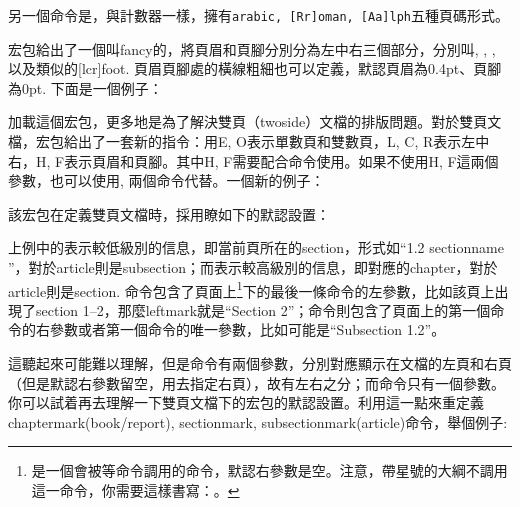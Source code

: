 另一個命令是，與計數器一樣，擁有\texttt{arabic, [Rr]oman, [Aa]lph}五種頁碼形式。

宏包給出了一個叫fancy的，將頁眉和頁腳分別分為左中右三個部分，分別叫, , , 以及類似的[lcr]foot. 頁眉頁腳處的橫線粗細也可以定義，默認頁眉為0.4pt、頁腳為0pt. 下面是一個例子：
\begin{latex}
\usepackage{fancyhdr}
\pagestyle{fancy}
    \lhead{}
    \chead{}
    \cfoot{\thepage}
\renewcommand{\headrulewidth}{0.4pt}
\renewcommand{\footrulewidth}{0.4pt}
\end{latex}

加載這個宏包，更多地是為了解決雙頁（twoside）文檔的排版問題。對於雙頁文檔，宏包給出了一套新的指令：用E, O表示單數頁和雙數頁，L, C, R表示左中右，H, F表示頁眉和頁腳。其中H, F需要配合命令使用。如果不使用H, F這兩個參數，也可以使用,  兩個命令代替。一個新的例子：
\begin{latex}
\fancyhead{} %
\fancyfoot{} %
    \fancyfoot[C]{\thepage}
\end{latex}

該宏包在定義雙頁文檔時，採用瞭如下的默認設置：
\begin{latex}
\fancyhead[LE,RO]{\slshape \rightmark}
\fancyhead[LO,RE]{\slshape \leftmark}
\fancyfoot[C]{\thepage}
\end{latex}

上例中的表示較低級別的信息，即當前頁所在的section，形式如“1.2 sectionname ”，對於article則是subsection；而表示較高級別的信息，即對應的chapter，對於article則是section. 命令包含了頁面上\footnote{是一個會被等命令調用的命令，默認右參數是空。注意，帶星號的大綱不調用這一命令，你需要這樣書寫：。}下的最後一條命令的左參數，比如該頁上出現了section 1--2，那麼leftmark就是“Section 2”；命令則包含了頁面上的第一個命令的右參數或者第一個命令的唯一參數，比如可能是“Subsection 1.2”。

這聽起來可能難以理解，但是命令有兩個參數，分別對應顯示在文檔的左頁和右頁（但是默認右參數留空，用去指定右頁），故有左右之分；而命令只有一個參數。你可以試着再去理解一下雙頁文檔下的宏包的默認設置。利用這一點來重定義chaptermark(book/report), sectionmark, subsectionmark(article)命令，舉個例子:
\begin{latex}
\renewcommand{\sectionmark}[1]{\markright{\thesection.\ #1}}
\renewcommand{\chaptermark}[1]{\markboth{\MakeUppercase{%
    \chaptername}\ \thechapter.\ #1}{}}
\end{latex}

